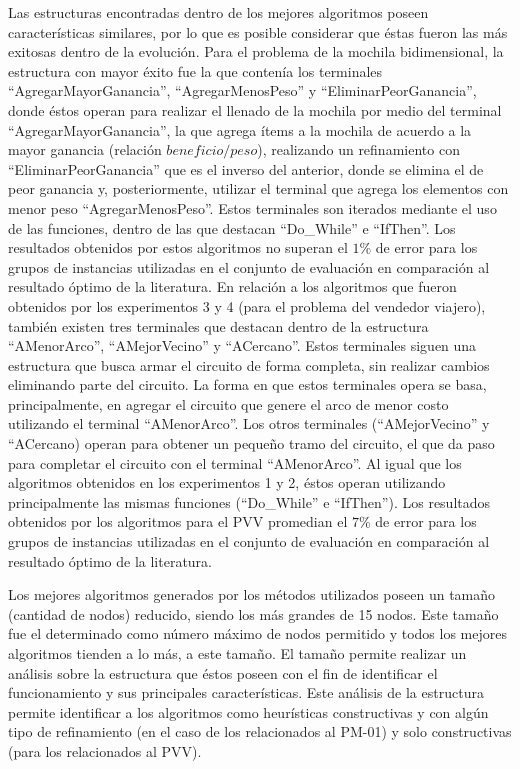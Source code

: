 Las estructuras encontradas dentro de los mejores algoritmos poseen características similares, por lo que es posible considerar que éstas fueron las más exitosas dentro de la evolución. Para el problema de la mochila bidimensional, la estructura con mayor éxito fue la que contenía los terminales “AgregarMayorGanancia”, “AgregarMenosPeso” y “EliminarPeorGanancia”, donde éstos operan para realizar el llenado de la mochila por medio del terminal “AgregarMayorGanancia”, la que agrega ítems a la mochila de acuerdo a la mayor ganancia (relación $beneficio/peso$), realizando un refinamiento con “EliminarPeorGanancia” que es el inverso del anterior, donde se elimina el de peor ganancia y, posteriormente, utilizar el terminal que agrega los elementos con menor peso “AgregarMenosPeso”. Estos terminales son iterados mediante el uso de las funciones, dentro de las que destacan “Do\_While” e “IfThen”. Los resultados obtenidos por estos algoritmos no superan el $1\%$ de error para los grupos de instancias utilizadas en el conjunto de evaluación en comparación al resultado óptimo de la literatura. En relación a los algoritmos que fueron obtenidos por los experimentos 3 y 4 (para el problema del vendedor viajero), también existen tres terminales que destacan dentro de la estructura “AMenorArco”, “AMejorVecino” y “ACercano”. Estos terminales siguen una estructura que busca armar el circuito de forma completa, sin realizar cambios eliminando parte del circuito. La forma en que estos terminales opera se basa, principalmente, en agregar el circuito que genere el arco de menor costo utilizando el terminal “AMenorArco”. Los otros terminales (“AMejorVecino” y “ACercano) operan para obtener un pequeño tramo del circuito, el que da paso para completar el circuito con el terminal “AMenorArco”. Al igual que los algoritmos obtenidos en los experimentos 1 y 2, éstos operan utilizando principalmente las mismas funciones (“Do\_While” e “IfThen”). Los resultados obtenidos por los algoritmos para el PVV promedian el $7\%$ de error para los grupos de instancias utilizadas en el conjunto de evaluación en comparación al resultado óptimo de la literatura.

Los mejores algoritmos generados por los métodos utilizados poseen un tamaño (cantidad de nodos) reducido, siendo los más grandes de 15 nodos. Este tamaño fue el determinado como número máximo de nodos permitido y todos los mejores algoritmos tienden a lo más, a este tamaño. El tamaño permite realizar un análisis sobre la estructura que éstos poseen con el fin de identificar el funcionamiento y sus principales características. Este análisis de la estructura permite identificar a los algoritmos como heurísticas constructivas y con algún tipo de refinamiento (en el caso de los relacionados al PM-01) y solo constructivas (para los relacionados al PVV).


